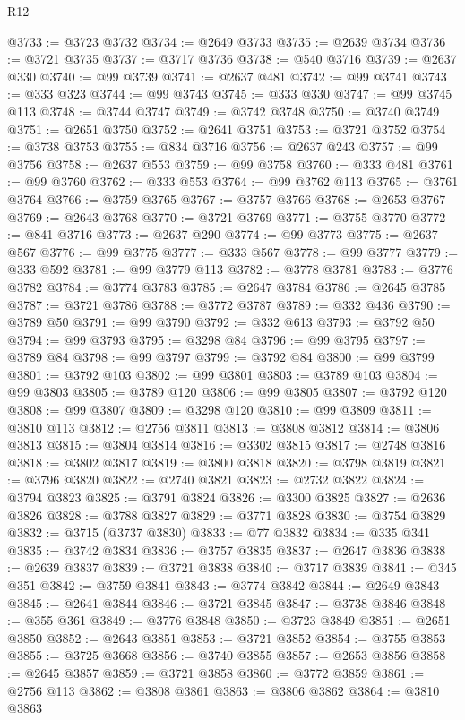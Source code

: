 \begin{lexlean}{R12}
\begin{coremodule}
{{{{{{{{{{{{{{{{{{{{{{{{{{{{{{{{{{{{{{{{{{{{{{{{{{{{{{{{{{{{{{{{{{{{{{{{{{{{{{{{{{{{{{{{{{{{{{{{{{{{{{{{{{@3733 := @3723 @3732
@3734 := @2649 @3733
@3735 := @2639 @3734
@3736 := @3721 @3735
@3737 := @3717 @3736
@3738 := @540 @3716
@3739 := @2637 @330
@3740 := @99 @3739
@3741 := @2637 @481
@3742 := @99 @3741
@3743 := @333 @323
@3744 := @99 @3743
@3745 := @333 @330
@3747 := @99 @3745 @113
@3748 := @3744 @3747
@3749 := @3742 @3748
@3750 := @3740 @3749
@3751 := @2651 @3750
@3752 := @2641 @3751
@3753 := @3721 @3752
@3754 := @3738 @3753
@3755 := @834 @3716
@3756 := @2637 @243
@3757 := @99 @3756
@3758 := @2637 @553
@3759 := @99 @3758
@3760 := @333 @481
@3761 := @99 @3760
@3762 := @333 @553
@3764 := @99 @3762 @113
@3765 := @3761 @3764
@3766 := @3759 @3765
@3767 := @3757 @3766
@3768 := @2653 @3767
@3769 := @2643 @3768
@3770 := @3721 @3769
@3771 := @3755 @3770
@3772 := @841 @3716
@3773 := @2637 @290
@3774 := @99 @3773
@3775 := @2637 @567
@3776 := @99 @3775
@3777 := @333 @567
@3778 := @99 @3777
@3779 := @333 @592
@3781 := @99 @3779 @113
@3782 := @3778 @3781
@3783 := @3776 @3782
@3784 := @3774 @3783
@3785 := @2647 @3784
@3786 := @2645 @3785
@3787 := @3721 @3786
@3788 := @3772 @3787
@3789 := @332 @436
@3790 := @3789 @50
@3791 := @99 @3790
@3792 := @332 @613
@3793 := @3792 @50
@3794 := @99 @3793
@3795 := @3298 @84
@3796 := @99 @3795
@3797 := @3789 @84
@3798 := @99 @3797
@3799 := @3792 @84
@3800 := @99 @3799
@3801 := @3792 @103
@3802 := @99 @3801
@3803 := @3789 @103
@3804 := @99 @3803
@3805 := @3789 @120
@3806 := @99 @3805
@3807 := @3792 @120
@3808 := @99 @3807
@3809 := @3298 @120
@3810 := @99 @3809
@3811 := @3810 @113
@3812 := @2756 @3811
@3813 := @3808 @3812
@3814 := @3806 @3813
@3815 := @3804 @3814
@3816 := @3302 @3815
@3817 := @2748 @3816
@3818 := @3802 @3817
@3819 := @3800 @3818
@3820 := @3798 @3819
@3821 := @3796 @3820
@3822 := @2740 @3821
@3823 := @2732 @3822
@3824 := @3794 @3823
@3825 := @3791 @3824
@3826 := @3300 @3825
@3827 := @2636 @3826
@3828 := @3788 @3827
@3829 := @3771 @3828
@3830 := @3754 @3829
@3832 := @3715 (@3737 @3830)
@3833 := @77 @3832
@3834 := @335 @341
@3835 := @3742 @3834
@3836 := @3757 @3835
@3837 := @2647 @3836
@3838 := @2639 @3837
@3839 := @3721 @3838
@3840 := @3717 @3839
@3841 := @345 @351
@3842 := @3759 @3841
@3843 := @3774 @3842
@3844 := @2649 @3843
@3845 := @2641 @3844
@3846 := @3721 @3845
@3847 := @3738 @3846
@3848 := @355 @361
@3849 := @3776 @3848
@3850 := @3723 @3849
@3851 := @2651 @3850
@3852 := @2643 @3851
@3853 := @3721 @3852
@3854 := @3755 @3853
@3855 := @3725 @3668
@3856 := @3740 @3855
@3857 := @2653 @3856
@3858 := @2645 @3857
@3859 := @3721 @3858
@3860 := @3772 @3859
@3861 := @2756 @113
@3862 := @3808 @3861
@3863 := @3806 @3862
@3864 := @3810 @3863
}}}}}}}}}}}}}}}}}}}}}}}}}}}}}}}}}}}}}}}}}}}}}}}}}}}}}}}}}}}}}}}}}}}}}}}}}}}}}}}}}}}}}}}}}}}}}}}}}}}}}}}}}}
\end{coremodule}
\end{lexlean}
